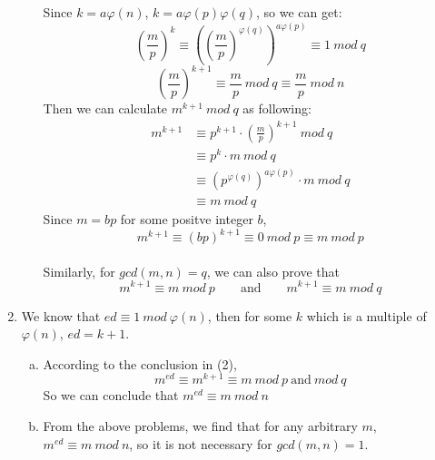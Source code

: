 \documentclass[12pt, a4paper]{article}
\begin{document}
\begin{enumerate}
\begin{enumerate}[(a)]
                    Since $k = a\varphi(n)$, $k = a\varphi(p)\varphi(q)$, so we can get:
                    $$(\frac{m}{p})^{k} \equiv ((\frac{m}{p})^{\varphi(q)})^{a\varphi(p)} \equiv 1\ mod\ q$$
                    $$(\frac{m}{p})^{k+1} \equiv \frac{m}{p}\ mod\ q \equiv \frac{m}{p}\ mod\ n$$
                    Then we can calculate $m^{k+1}\ mod\ q$ as following:
                    \begin{align*}
                        m^{k+1} &\equiv p^{k+1}\cdot (\frac{m}{p})^{k+1}\ mod\ q\\
                                &\equiv p^k\cdot m\ mod\ q\\
                                &\equiv (p^{\varphi(q)})^{a\varphi(p)} \cdot m\ mod\ q\\
                                &\equiv m\ mod\ q
                    \end{align*}
                    Since $m = bp$ for some positve integer $b$, 
                    $$m^{k+1} \equiv (bp)^{k+1} \equiv 0\ mod\ p \equiv m\ mod\ p$$
                    \\
                    Similarly, for $gcd(m,n) = q$, we can also prove that 
                    $$m^{k+1} \equiv m\ mod\ p \qquad \text{and} \qquad m^{k+1} \equiv m\ mod\ q$$
          \end{enumerate}
          
    \item We know that $ed \equiv 1\ mod\ \varphi(n)$, then for some $k$ which is a multiple of $\varphi(n)$, 
          $ed = k + 1$.
          \begin{enumerate}[(a)]
              \item According to the conclusion in (2), 
                    $$m^{ed} \equiv m^{k+1} \equiv m\ mod\ p\ \text{and}\ mod\ q$$
                    So we can conclude that $m^{ed} \equiv m\ mod\ n$
              \item From the above problems, we find that for any arbitrary $m$, $m^{ed} \equiv m\ mod\ n$, 
                    so it is not necessary for $gcd(m,n) = 1$.
          \end{enumerate}
          
\end{enumerate}
\end{document}
